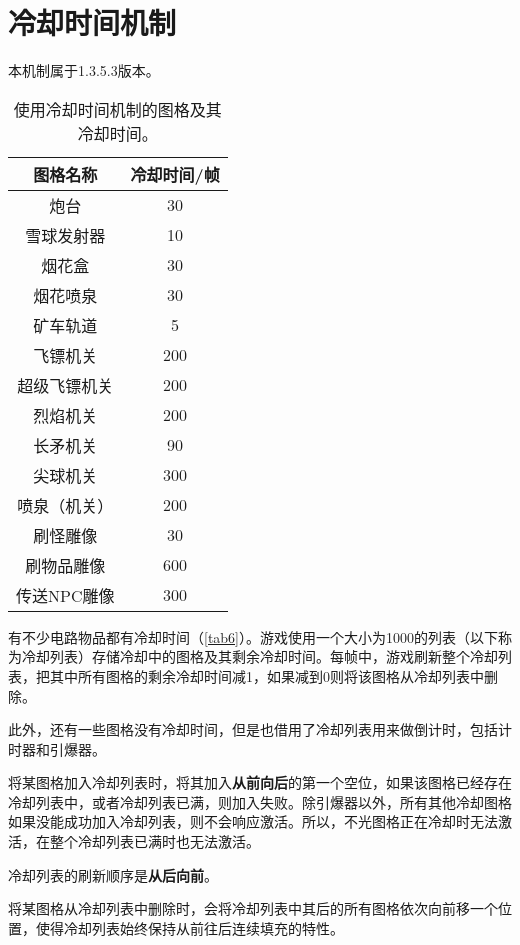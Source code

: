 \chapter{冷却时间机制}\label{app35}
\begin{note*}{}{}
本机制属于1.3.5.3版本。
\end{note*}
\begin{table}[!ht]
\centering
\begin{tabular}{|c|c|}
\hline
图格名称&冷却时间/帧\\\hline\hline
炮台&30\\\hline
雪球发射器&10\\\hline
烟花盒&30\\\hline
烟花喷泉&30\\\hline
矿车轨道&5\\\hline
飞镖机关&200\\\hline
超级飞镖机关&200\\\hline
烈焰机关&200\\\hline
长矛机关&90\\\hline
尖球机关&300\\\hline
喷泉（机关）&200\\\hline
刷怪雕像&30\\\hline
刷物品雕像&600\\\hline
传送NPC雕像&300\\\hline
\end{tabular}
\caption{使用冷却时间机制的图格及其冷却时间。}\label{tab6}
\end{table}

有不少电路物品都有冷却时间（\autoref{tab6}）。游戏使用一个大小为1000的列表（以下称为冷却列表）存储冷却中的图格及其剩余冷却时间。每帧中，游戏刷新整个冷却列表，把其中所有图格的剩余冷却时间减1，如果减到0则将该图格从冷却列表中删除。

此外，还有一些图格没有冷却时间，但是也借用了冷却列表用来做倒计时，包括计时器和引爆器。

将某图格加入冷却列表时，将其加入\textbf{从前向后}的第一个空位，如果该图格已经存在冷却列表中，或者冷却列表已满，则加入失败。除引爆器以外，所有其他冷却图格如果没能成功加入冷却列表，则不会响应激活。所以，不光图格正在冷却时无法激活，在整个冷却列表已满时也无法激活。

冷却列表的刷新顺序是\textbf{从后向前}。

将某图格从冷却列表中删除时，会将冷却列表中其后的所有图格依次向前移一个位置，使得冷却列表始终保持从前往后连续填充的特性。
